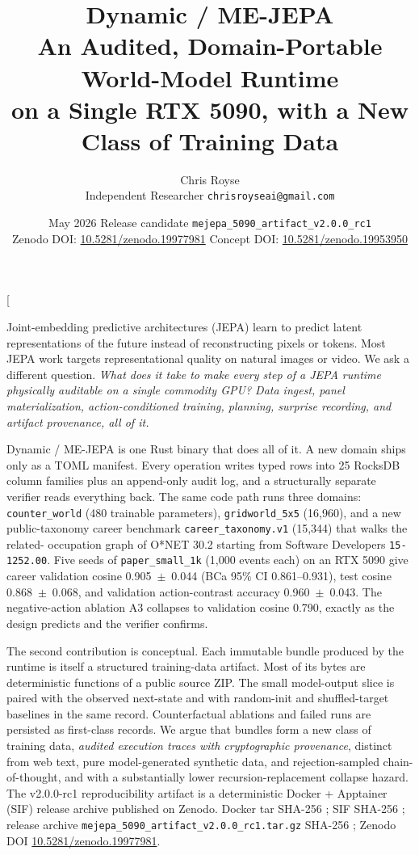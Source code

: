 \documentclass[10pt,twocolumn,letterpaper]{article}
\title{\vspace{-0.4em}\bfseries\Large
  Dynamic / ME-JEPA\\[3pt]
  \large An Audited, Domain-Portable World-Model Runtime\\
  on a Single RTX 5090, with a New Class of Training Data
  \vspace{0.2em}}
\author{%
  \normalsize Chris Royse\\[1pt]
  \footnotesize Independent Researcher\quad\textbullet\quad
  \texttt{chrisroyseai@gmail.com}%
}
\date{\footnotesize May 2026 \quad\textbullet\quad
  Release candidate
  \texttt{mejepa\_5090\_artifact\_v2.0.0\_rc1}\\
  \footnotesize Zenodo DOI: \href{https://doi.org/10.5281/zenodo.19977981}{10.5281/zenodo.19977981}
  \quad\textbullet\quad
  Concept DOI: \href{https://doi.org/10.5281/zenodo.19953950}{10.5281/zenodo.19953950}}
\newcommand{\sha}[1]{\texttt{\footnotesize\seqsplit{#1}}}
\begin{document}
\twocolumn[
  \maketitle
  \begin{onecolabstract}
  \noindent
  Joint-embedding predictive architectures (JEPA) learn to predict
  latent representations of the future instead of reconstructing
  pixels or tokens. Most JEPA work targets representational quality
  on natural images or video. We ask a different question.
  \emph{What does it take to make every step of a JEPA runtime
  physically auditable on a single commodity GPU? Data ingest,
  panel materialization, action-conditioned training, planning,
  surprise recording, and artifact provenance, all of
  it.}\par\vspace{3pt}\noindent
  Dynamic / ME-JEPA is one Rust binary that does all of it. A new
  domain ships only as a TOML manifest. Every operation writes typed
  rows into 25 RocksDB column families plus an append-only audit log,
  and a structurally separate verifier reads everything back. The
  same code path runs three domains: \texttt{counter\_world}
  (480 trainable parameters), \texttt{gridworld\_5x5} (16{,}960), and
  a new public-taxonomy career benchmark
  \texttt{career\_taxonomy.v1} (15{,}344) that walks the related-
  occupation graph of O*NET 30.2 starting from Software Developers
  \texttt{15-1252.00}. Five seeds of \texttt{paper\_small\_1k}
  (1{,}000 events each) on an RTX 5090 give career validation cosine
  0.905~$\pm$~0.044 (BCa 95\% CI 0.861--0.931), test cosine
  0.868~$\pm$~0.068, and validation action-contrast accuracy
  0.960~$\pm$~0.043. The negative-action ablation A3 collapses to
  validation cosine 0.790, exactly as the design predicts and the
  verifier confirms.\par\vspace{3pt}\noindent
  The second contribution is conceptual. Each immutable bundle
  produced by the runtime is itself a structured training-data
  artifact. Most of its bytes are deterministic functions of a
  public source ZIP. The small model-output slice is paired with
  the observed next-state and with random-init and shuffled-target
  baselines in the same record. Counterfactual ablations and failed
  runs are persisted as first-class records. We argue that bundles
  form a new class of training data, \emph{audited execution traces
  with cryptographic provenance}, distinct from web text, pure
  model-generated synthetic data, and rejection-sampled
  chain-of-thought, and with a substantially lower
  recursion-replacement collapse hazard. The v2.0.0-rc1 reproducibility
  artifact is a deterministic Docker + Apptainer (SIF) release
  archive published on Zenodo. Docker tar SHA-256
  \sha{830304d5\dots e1940b}; SIF SHA-256 \sha{78c87c55\dots f386bad};
  release archive \texttt{mejepa\_5090\_artifact\_v2.0.0\_rc1.tar.gz}
  SHA-256 \sha{91461515\dots b1a01}; Zenodo DOI
  \href{https://doi.org/10.5281/zenodo.19977981}{10.5281/zenodo.19977981}.


\end{onecolabstract}
\end{document}
